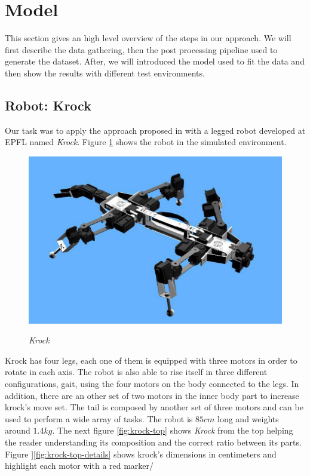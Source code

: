 \documentclass[../document.tex]{subfiles}
\begin{document}
\section{Model}
This section gives an high level overview of the steps in our approach. We will first describe the data gathering,  then the post processing pipeline used to generate the dataset. After, we will introduced the model used to fit the data and then show the results with different test environments.
\subsection{Robot: Krock}
Our task was to apply the approach proposed in \cite{omar@traversability} with a legged robot developed at EPFL named 
\emph{Krock}. Figure \ref{fig:krock} shows the robot in the simulated environment.
\begin{figure}[H]
    \centering
    \includegraphics[width=\linewidth]{img/krock-1.jpg}
    \label{fig:krock}
    \caption{\emph{Krock}}
\end{figure}
Krock has four legs, each one of them is equipped with three motors in order to rotate in each axis. The robot is 
also able to rise itself in three different configurations, gait, using the four motors on the body connected 
to the legs. In addition, there are an other set of two motors in the inner body part to increase krock's move set. 
The tail is composed by another set of three motors and can be used to perform a wide array of tasks.
The robot is $85cm$ long and weights around $1.4kg$. The next figure \ref{fig:krock-top} shows \emph{Krock} from the top helping the reader understanding its composition and the correct ratio between its parts. Figure ]\ref{fig:krock-top-details} shows krock's dimensions in centimeters and highlight each motor with a red marker/
\end{document}
